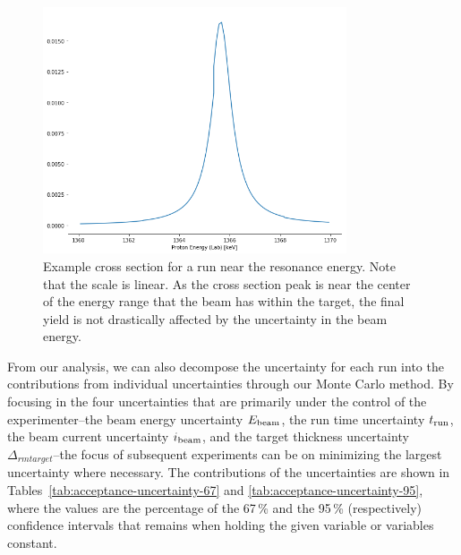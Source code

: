 \begin{figure}
    \begin{center}
        \label{fig:example-cross-section}
        \centerline{
            \includegraphics[width=0.8\textwidth]{figures/xs_example.png}}
        \caption[Example cross section]{Example cross section for a run
            near the resonance energy. Note that the scale is linear. As
            the cross section peak is near the center of the energy
            range that the beam has within the target, the final yield
            is not drastically affected by the uncertainty in the beam
            energy.}
    \end{center}
\end{figure}

From our analysis, we can also decompose the uncertainty for each run
into the contributions from individual uncertainties through our Monte
Carlo method. By focusing in the four uncertainties that are primarily
under the control of the experimenter\---{}the beam energy uncertainty
$E_{\rm beam}$, the run time uncertainty $t_{\rm run}$, the beam current
uncertainty $i_{\rm beam}$, and the target thickness uncertainty
$\Delta_{rm target}$\---{}the focus of subsequent experiments can be on
minimizing the largest uncertainty where necessary. The contributions of
the uncertainties are shown in
Tables~\ref{tab:acceptance-uncertainty-67} and
\ref{tab:acceptance-uncertainty-95}, where the values are the percentage
of the 67\,\% and the 95\,\% (respectively) confidence intervals that
remains when holding the given variable or variables constant.

